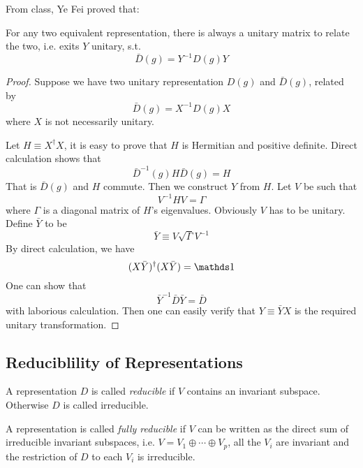 From class, Ye Fei proved that:
\begin{thm}
    For any two equivalent representation, there is always a unitary
    matrix to relate the two, i.e. exits $Y$ unitary, s.t.
    $$ \bar{D}(g) = Y^{-1} D(g) Y$$
\end{thm}
\begin{proof}
    Suppose we have two unitary representation $D(g)$ and
    $\bar{D}(g)$, related by
    $$ \bar{D}(g) = X^{-1} D(g) X$$
    where $X$ is not necessarily unitary.

    Let $H\equiv X^\dagger X$, it is easy to prove that $H$ is
    Hermitian and positive definite. Direct calculation shows that
    $$ \bar{D}^{-1}(g) H \bar{D}(g) = H$$
    That is $\bar{D}(g)$ and $H$ commute.
    Then we construct $Y$ from $H$. Let $V$ be such that
    \begin{equation}
        V^{-1} H V = \Gamma
    \end{equation}
    where $\Gamma$ is a diagonal matrix of $H$'s eigenvalues.
    Obviously $V$ has to be unitary. Define $\bar{Y}$ to be
    \begin{equation}
        \bar{Y}\equiv V \sqrt{\Gamma} V^{-1}
    \end{equation}
    By direct calculation, we have
    $$ (X\bar{Y})^\dagger (X\bar{Y}) = \id$$
    One can show that
    $$ \bar{Y}^{-1} \bar{D} \bar{Y} = \bar{D}$$
    with laborious calculation. Then one can easily verify that
    $Y\equiv \bar{Y}X$ is the required unitary transformation.
\end{proof}

\subsection{Reduciblility of Representations}
\label{sec:Reduciblility-of-Representations}

\begin{defi}
    A representation $D$ is called \textit{reducible} if $V$ contains an
    invariant subspace. Otherwise $D$ is called irreducible.

    A representation is called \textit{fully reducible} if $V$ can be
    written as the direct sum of irreducible invariant subspaces, i.e.
    $V=V_1\oplus \cdots \oplus V_p$, all the $V_i$ are invariant and the
    restriction of $D$ to each $V_i$ is irreducible.
\end{defi}

